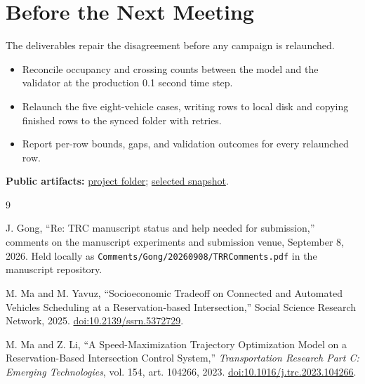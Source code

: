 \documentclass[10pt]{article}
\newenvironment{tightitems}{%
  \begin{itemize}[leftmargin=1.15em,label=\textcolor{uablue}{\scriptsize$\bullet$},
    topsep=0.10em,itemsep=0.16em,parsep=0pt,partopsep=0pt]}{\end{itemize}}
\newcommand{\artifact}[2]{\href{#1}{#2}}
\begin{document}
\section{Before the Next Meeting}
\label{sec:next}

\sumpara The deliverables repair the disagreement before any campaign is relaunched. \sumparaend
\begin{tightitems}
  \item \fin Reconcile occupancy and crossing counts between the model and the validator at the production 0.1 second time step. \fine
  \item \fin Relaunch the five eight-vehicle cases, writing rows to local disk and copying finished rows to the synced folder with retries. \fine
  \item \fin Report per-row bounds, gaps, and validation outcomes for every relaunched row. \fine
\end{tightitems}

\vspace{0.6em}
{\footnotesize\textbf{Public artifacts:}
\artifact{https://github.com/mutingma123/OpenProjects/tree/main/BiObjectivePaperRevision}{project folder};
\artifact{https://github.com/mutingma123/OpenProjects/tree/main/BiObjectivePaperRevision/Figures}{selected snapshot}.\par}

\clearpage
{}
{}
\begin{thebibliography}{9}
\small

\fin J. Gong, ``Re: TRC manuscript status and help needed for submission,'' comments on the manuscript experiments and submission venue, September 8, 2026. \fine
Held locally as \texttt{Comments/Gong/20260908/TRRComments.pdf} in the manuscript repository.

\fin M. Ma and M. Yavuz, ``Socioeconomic Tradeoff on Connected and Automated Vehicles Scheduling at a Reservation-based Intersection,'' Social Science Research Network, 2025. \fine
\href{https://doi.org/10.2139/ssrn.5372729}{doi:10.2139/ssrn.5372729}.

\fin M. Ma and Z. Li, ``A Speed-Maximization Trajectory Optimization Model on a Reservation-Based Intersection Control System,'' \textit{Transportation Research Part C: Emerging Technologies}, vol. 154, art. 104266, 2023. \fine
\href{https://doi.org/10.1016/j.trc.2023.104266}{doi:10.1016/j.trc.2023.104266}.

\end{thebibliography}
\end{document}
